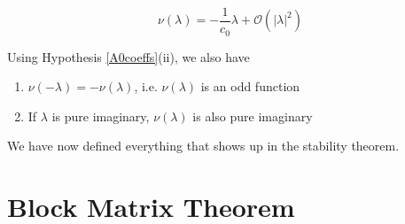 \documentclass[12pt]{article}
\begin{document}
\begin{equation}\label{nulambda}
\nu(\lambda) = -\frac{1}{c_0} \lambda + \mathcal{O}(|\lambda|^2)
\end{equation}

Using Hypothesis \ref{A0coeffs}(ii), we also have

\begin{enumerate}
\item $\nu(-\lambda) = -\nu(\lambda)$, i.e. $\nu(\lambda)$ is an odd function 
\item If $\lambda$ is pure imaginary, $\nu(\lambda)$ is also pure imaginary
\end{enumerate}

We have now defined everything that shows up in the stability theorem.

\section{Block Matrix Theorem}
\end{document}
